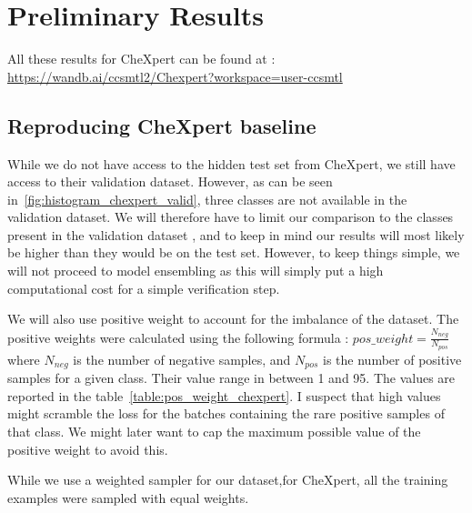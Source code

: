 \documentclass[11pt]{article}
\begin{document}
    \section{Preliminary Results}
        All these results for CheXpert can be found at : \url{https://wandb.ai/ccsmtl2/Chexpert?workspace=user-ccsmtl}
        \subsection{Reproducing CheXpert baseline}
            While we do not have access to the hidden test set from CheXpert, we still have access to their validation dataset. However,
            as can be seen in~\ref{fig:histogram_chexpert_valid}, three classes are not available in the validation dataset. We will therefore have to
            limit our comparison to the classes present in the validation dataset , and to keep in mind our results will
            most likely be higher than they would be on the test set. However, to keep things simple, we will not proceed to model ensembling as this
            will simply put a high computational cost for a simple verification step.

            We will also use positive weight to account for the imbalance of the dataset. The positive weights were calculated using the following formula : $pos\_weight = \frac{N_{neg}}{N_{pos}}$ where $N_{neg}$ is the number of negative samples, and $N_{pos}$ is the number of positive samples for a given class. Their value range
        in between 1 and 95. The values are reported in the table~\ref{table:pos_weight_chexpert}. I suspect that high values might scramble the loss for the batches containing the rare positive samples of that class. We might later want to cap
        the maximum possible value of the positive weight to avoid this.

        While we use a weighted sampler for our dataset,for CheXpert, all the training examples were sampled with equal weights.
\end{document}
